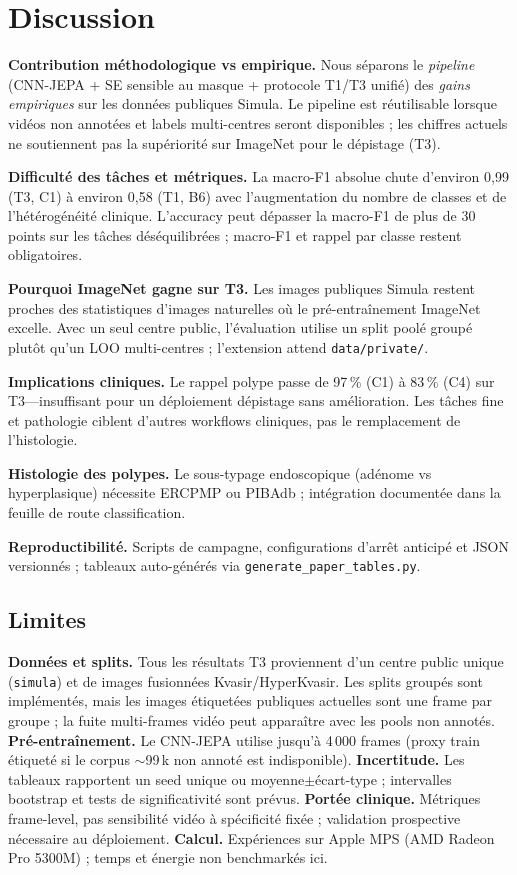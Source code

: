 \section{Discussion}
\label{sec:discussion}

\textbf{Contribution méthodologique vs empirique.}
Nous séparons le \emph{pipeline} (CNN-JEPA + SE sensible au masque + protocole T1/T3 unifié) des \emph{gains empiriques} sur les données publiques Simula.
Le pipeline est réutilisable lorsque vidéos non annotées et labels multi-centres seront disponibles ; les chiffres actuels ne soutiennent pas la supériorité sur ImageNet pour le dépistage (T3).

\textbf{Difficulté des tâches et métriques.}
La macro-F1 absolue chute d'environ 0,99 (T3, C1) à environ 0,58 (T1, B6) avec l'augmentation du nombre de classes et de l'hétérogénéité clinique.
L'accuracy peut dépasser la macro-F1 de plus de 30 points sur les tâches déséquilibrées ; macro-F1 et rappel par classe restent obligatoires.

\textbf{Pourquoi ImageNet gagne sur T3.}
Les images publiques Simula restent proches des statistiques d'images naturelles où le pré-entraînement ImageNet excelle.
Avec un seul centre public, l'évaluation utilise un split poolé groupé plutôt qu'un LOO multi-centres ; l'extension attend \texttt{data/private/}.

\textbf{Implications cliniques.}
Le rappel polype passe de 97\,\% (C1) à 83\,\% (C4) sur T3---insuffisant pour un déploiement dépistage sans amélioration.
Les tâches fine et pathologie ciblent d'autres workflows cliniques, pas le remplacement de l'histologie.

\textbf{Histologie des polypes.}
Le sous-typage endoscopique (adénome vs hyperplasique) nécessite ERCPMP ou PIBAdb ; intégration documentée dans la feuille de route classification.

\textbf{Reproductibilité.}
Scripts de campagne, configurations d'arrêt anticipé et JSON versionnés ; tableaux auto-générés via \texttt{generate\_paper\_tables.py}.

\subsection{Limites}
\label{sec:limitations}

\textbf{Données et splits.} Tous les résultats T3 proviennent d'un centre public unique (\texttt{simula}) et de \numsamples{} images fusionnées Kvasir/HyperKvasir.
Les splits groupés sont implémentés, mais les images étiquetées publiques actuelles sont une frame par groupe ; la fuite multi-frames vidéo peut apparaître avec les pools non annotés.
\textbf{Pré-entraînement.} Le CNN-JEPA utilise jusqu'à 4\,000 frames (proxy train étiqueté si le corpus $\sim$99\,k non annoté est indisponible).
\textbf{Incertitude.} Les tableaux rapportent un seed unique ou moyenne$\pm$écart-type ; intervalles bootstrap et tests de significativité sont prévus.
\textbf{Portée clinique.} Métriques frame-level, pas sensibilité vidéo à spécificité fixée ; validation prospective nécessaire au déploiement.
\textbf{Calcul.} Expériences sur Apple MPS (AMD Radeon Pro 5300M) ; temps et énergie non benchmarkés ici.
